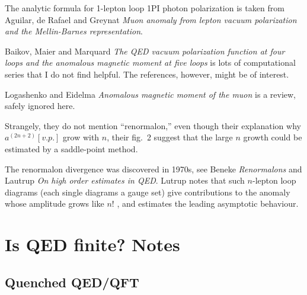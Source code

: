 \begin{description}
The analytic formula for 1-lepton loop 1PI photon polarization is taken
from Aguilar, de Rafael and Greynat {\em Muon anomaly from
lepton vacuum polarization and the {Mellin-Barnes} representation}.

Baikov, Maier and Marquard {\em The {QED} vacuum
polarization function at four loops and the anomalous magnetic moment at
five loops} is lots of computational series that I do not find helpful.
The references, however, might be of interest.

Logashenko and Eidelma {\em Anomalous magnetic moment of the
muon} is a review, safely ignored here.

Strangely, they do not mention ``renormalon,'' even though their
explanation why $a^{(2n+2)}[v.p.]$ grow with $n$, their fig.~2 suggest
that the large $n$ growth could be estimated by a saddle-point method.

The renormalon divergence was discovered in 1970s, see
Beneke {\em Renormalons} and Lautrup {\em On
high order estimates in {QED}}. Lutrup notes that such $n$-lepton loop
diagrams (each single diagrams a gauge set) give contributions to the
anomaly whose amplitude grows like $n!$ , and estimates the leading
asymptotic behaviour.




\end{description}

\newpage
\section{Is QED finite? Notes}
\label{sect:finiteBlog}

\subsection{Quenched QED/QFT}
\label{sect:quenched QE}

